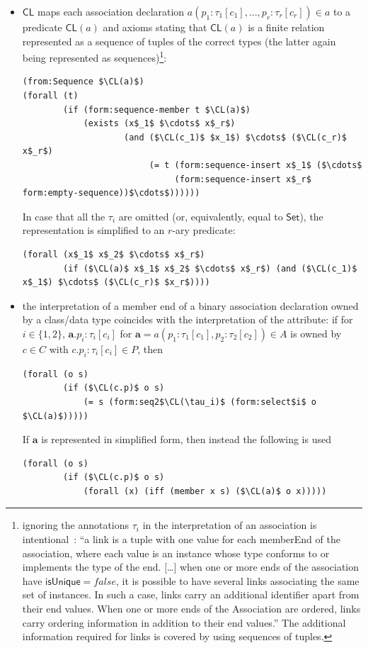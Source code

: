 \documentclass[10pt, a4paper]{isov2}
\newcommand*{\CL}{\ensuremath{\mathsf{CL}}\xspace}
\newcommand{\uml}[1]{\textsf{#1}}
\begin{document}
\begin{itemize}[topsep=0pt, label=--, leftmargin=*]
  \item $\CL$ maps each association declaration
$a(p_1 : \tau_1[c_1], \ldots, p_r : \tau_r[c_r])\in a$
to a predicate $\CL(a)$
and axioms stating that $\CL(a)$
is a finite relation represented as a sequence of tuples of the correct
types (the latter again being represented as
sequences)\footnote{ignoring the annotations $\tau_i$
  in the interpretation of an association is
  intentional~\cite[p.~197]{uml-2.5}: ``a link is a tuple with one value
  for each \uml{memberEnd} of the association, where each value is an
  instance whose type conforms to or implements the type of the end.
  [\ldots] when one or more ends of the association have
  $\uml{isUnique} = \mathit{false}$,
  it is possible to have several links associating the same set of
  instances. In such a case, links carry an additional identifier apart
  from their end values.  When one or more ends of the Association are
  ordered, links carry ordering information in addition to their end
  values.'' The additional information required for links is covered by
  using sequences of tuples.}:
%
\begin{lstlisting}[language=clif, mathescape]
(from:Sequence $\CL(a)$)
(forall (t)
        (if (form:sequence-member t $\CL(a)$)
            (exists (x$_1$ $\cdots$ x$_r$)
                    (and ($\CL(c_1)$ $x_1$) $\cdots$ ($\CL(c_r)$ x$_r$)
                         (= t (form:sequence-insert x$_1$ ($\cdots$
                              (form:sequence-insert x$_r$ form:empty-sequence))$\cdots$))))))
\end{lstlisting}

In case that all the $\tau_i$ are omitted (or, equivalently, equal to 
$\mathsf{Set}$), the representation is simplified to an $r$-ary predicate:
%
\begin{lstlisting}[language=clif, mathescape]
(forall (x$_1$ x$_2$ $\cdots$ x$_r$)
        (if ($\CL(a)$ x$_1$ x$_2$ $\cdots$ x$_r$) (and ($\CL(c_1)$ x$_1$) $\cdots$ ($\CL(c_r)$ $x_r$))))
\end{lstlisting}
%
  \item the interpretation of a member end of a binary association
declaration owned by a class/data type coincides with the interpretation
of the attribute: if for $i\in\{1,2\}$,
$\mathbf{a}.p_i : \tau_i[c_i]$
for $\mathbf{a} = a(p_1 : \tau_1[c_1], p_2 : \tau_2[c_2]) \in A$
is owned by $c \in C$ with $c.p_i : \tau_i[c_i] \in P$, then
%
\begin{lstlisting}[language=clif, mathescape]
(forall (o s)
        (if ($\CL(c.p)$ o s)
            (= s (form:seq2$\CL(\tau_i)$ (form:select$i$ o $\CL(a)$)))))
\end{lstlisting}
%
If $\mathbf{a}$ is represented in simplified form, then instead the
following is used
%
\begin{lstlisting}[language=clif, mathescape]
(forall (o s)
        (if ($\CL(c.p)$ o s)
            (forall (x) (iff (member x s) ($\CL(a)$ o x)))))
\end{lstlisting}


\end{itemize}
\end{document}
